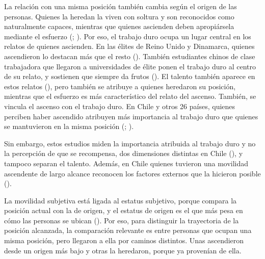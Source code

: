 \documentclass[
  spanish,
  a4paper,
  oneside]{scrbook}
\begin{document}
La relación con una misma posición también cambia según el origen de las
personas. Quienes la heredan la viven con soltura y son reconocidos como
naturalmente capaces, mientras que quienes ascienden deben apropiársela
mediante el esfuerzo (; ). Por eso, el trabajo duro ocupa un lugar central en los relatos de
quienes ascienden. En las élites de Reino Unido y Dinamarca, quienes
ascendieron lo destacan más que el resto
().
También estudiantes chinos de clase trabajadora que llegaron a
universidades de élite ponen el trabajo duro al centro de su relato, y
sostienen que siempre da frutos (). El talento también aparece en estos relatos
(), pero
también se atribuye a quienes heredaron su posición, mientras que el
esfuerzo es más característico del relato del ascenso. También, se
vincula el ascenso con el trabajo duro. En Chile y otros 26 países,
quienes perciben haber ascendido atribuyen más importancia al trabajo
duro que quienes se mantuvieron en la misma posición
(;
).

Sin embargo, estos estudios miden la importancia atribuida al trabajo
duro y no la percepción de que se recompensa, dos dimensiones distintas
en Chile (), y tampoco separan el talento. Además, en Chile quienes
tuvieron una movilidad ascendente de largo alcance reconocen los
factores externos que la hicieron posible
().

La movilidad subjetiva está ligada al estatus subjetivo, porque compara
la posición actual con la de origen, y el estatus de origen es el que
más pesa en cómo las personas se ubican
(). Por eso, para distinguir la trayectoria de la posición
alcanzada, la comparación relevante es entre personas que ocupan una
misma posición, pero llegaron a ella por caminos distintos. Unas
ascendieron desde un origen más bajo y otras la heredaron, porque ya
provenían de ella.
\end{document}
